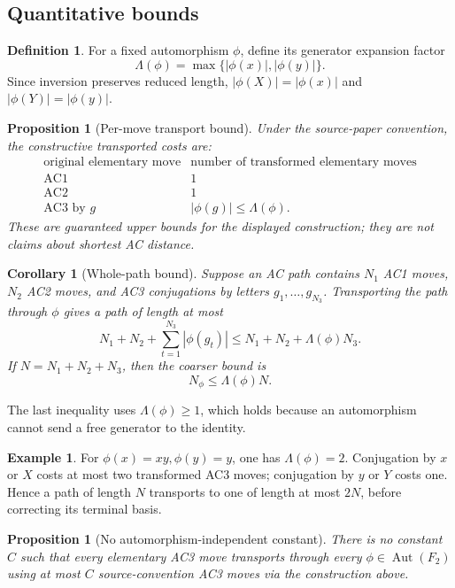 \documentclass[11pt]{article}
\newtheorem{proposition}[theorem]{Proposition}
\newtheorem{corollary}[theorem]{Corollary}
\theoremstyle{definition}
\newtheorem{definition}[theorem]{Definition}
\newtheorem{example}[theorem]{Example}
\theoremstyle{remark}
\newcommand{\F}{F_2}
\newcommand{\Aut}{\operatorname{Aut}}
\newcommand{\AC}{\mathrm{AC}}
\newcommand{\len}[1]{\left|#1\right|}
\begin{document}
\subsection{Quantitative bounds}

\begin{definition}
For a fixed automorphism \(\phi\), define its generator expansion factor
\[
  \Lambda(\phi)
  =\max\{\len{\phi(x)},\len{\phi(y)}\}.
\]
Since inversion preserves reduced length,
\(\len{\phi(X)}=\len{\phi(x)}\) and
\(\len{\phi(Y)}=\len{\phi(y)}\).
\end{definition}

\begin{proposition}[Per-move transport bound]
\label{prop:per-move-bound}
Under the source-paper convention, the constructive transported costs are:
\[
\begin{array}{c|c}
\text{original elementary move}&
\text{number of transformed elementary moves}\\
\hline
\AC1&1\\
\AC2&1\\
\AC3\text{ by }g&\len{\phi(g)}\le\Lambda(\phi).
\end{array}
\]
These are guaranteed upper bounds for the displayed construction; they are
not claims about shortest AC distance.
\end{proposition}

\begin{corollary}[Whole-path bound]
\label{cor:path-bound}
Suppose an AC path contains \(N_1\) AC1 moves, \(N_2\) AC2 moves, and
AC3 conjugations by letters \(g_1,\ldots,g_{N_3}\).  Transporting the path
through \(\phi\) gives a path of length at most
\[
  N_1+N_2+\sum_{t=1}^{N_3}\len{\phi(g_t)}
  \le N_1+N_2+\Lambda(\phi)N_3.
\]
If \(N=N_1+N_2+N_3\), then the coarser bound is
\[
  N_\phi\le\Lambda(\phi)N.
\]
\end{corollary}

The last inequality uses \(\Lambda(\phi)\ge1\), which holds because an
automorphism cannot send a free generator to the identity.

\begin{example}
For \(\phi(x)=xy,\phi(y)=y\), one has \(\Lambda(\phi)=2\).
Conjugation by \(x\) or \(X\) costs at most two transformed AC3 moves;
conjugation by \(y\) or \(Y\) costs one.  Hence a path of length \(N\)
transports to one of length at most \(2N\), before correcting its terminal
basis.
\end{example}

\begin{proposition}[No automorphism-independent constant]
\label{prop:no-uniform}
There is no constant \(C\) such that every elementary AC3 move transports
through every \(\phi\in\Aut(\F)\) using at most \(C\) source-convention AC3
moves via the construction above.
\end{proposition}
\end{document}
